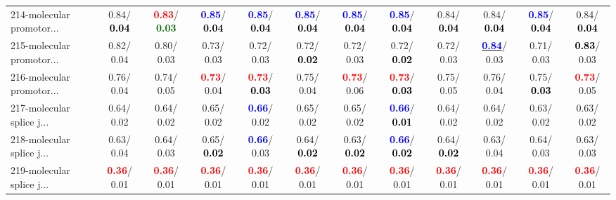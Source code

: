 \begin{table}[h]
\begin{center}
{\begin{tabular}{lc|c|c|c|c|c|c|c|c|c|c}
214-molecular promotor... &   0.84/\textcolor{black}{\textbf{  0.04}} & \textcolor{red}{\textbf{  0.83}}/\textcolor{darkgreen}{\textbf{  0.03}} & \textcolor{blue}{\textbf{  0.85}}/\textcolor{black}{\textbf{  0.04}} & \textcolor{blue}{\textbf{  0.85}}/\textcolor{black}{\textbf{  0.04}} & \textcolor{blue}{\textbf{  0.85}}/\textcolor{black}{\textbf{  0.04}} & \textcolor{blue}{\textbf{  0.85}}/\textcolor{black}{\textbf{  0.04}} & \textcolor{blue}{\textbf{  0.85}}/\textcolor{black}{\textbf{  0.04}} &   0.84/\textcolor{black}{\textbf{  0.04}} &   0.84/\textcolor{black}{\textbf{  0.04}} & \textcolor{blue}{\textbf{  0.85}}/\textcolor{black}{\textbf{  0.04}} &   0.84/\textcolor{black}{\textbf{  0.04}} \\
215-molecular promotor... &   0.82/  0.04 &   0.80/  0.03 &   0.73/  0.03 &   0.72/  0.03 &   0.72/\textcolor{black}{\textbf{  0.02}} &   0.72/  0.03 &   0.72/\textcolor{black}{\textbf{  0.02}} &   0.72/  0.03 & \underline{\textcolor{blue}{\textbf{  0.84}}}/  0.03 &   0.71/  0.03 & \textcolor{black}{\textbf{  0.83}}/  0.03 \\
216-molecular promotor... &   0.76/  0.04 &   0.74/  0.05 & \textcolor{red}{\textbf{  0.73}}/  0.04 & \textcolor{red}{\textbf{  0.73}}/\textcolor{black}{\textbf{  0.03}} &   0.75/  0.04 & \textcolor{red}{\textbf{  0.73}}/  0.06 & \textcolor{red}{\textbf{  0.73}}/\textcolor{black}{\textbf{  0.03}} &   0.75/  0.05 &   0.76/  0.04 &   0.75/\textcolor{black}{\textbf{  0.03}} & \textcolor{red}{\textbf{  0.73}}/  0.05 \\
217-molecular splice j... &   0.64/  0.02 &   0.64/  0.02 &   0.65/  0.02 & \textcolor{blue}{\textbf{  0.66}}/  0.02 &   0.65/  0.02 &   0.65/  0.02 & \textcolor{blue}{\textbf{  0.66}}/\textcolor{black}{\textbf{  0.01}} &   0.64/  0.02 &   0.64/  0.02 &   0.63/  0.02 &   0.63/  0.02 \\
218-molecular splice j... &   0.63/  0.04 &   0.64/  0.03 &   0.65/\textcolor{black}{\textbf{  0.02}} & \textcolor{blue}{\textbf{  0.66}}/  0.03 &   0.64/\textcolor{black}{\textbf{  0.02}} &   0.63/\textcolor{black}{\textbf{  0.02}} & \textcolor{blue}{\textbf{  0.66}}/\textcolor{black}{\textbf{  0.02}} &   0.64/\textcolor{black}{\textbf{  0.02}} &   0.63/  0.04 &   0.64/  0.03 &   0.63/  0.03 \\
219-molecular splice j... & \textcolor{red}{\textbf{  0.36}}/  0.01 & \textcolor{red}{\textbf{  0.36}}/  0.01 & \textcolor{red}{\textbf{  0.36}}/  0.01 & \textcolor{red}{\textbf{  0.36}}/  0.01 & \textcolor{red}{\textbf{  0.36}}/  0.01 & \textcolor{red}{\textbf{  0.36}}/  0.01 & \textcolor{red}{\textbf{  0.36}}/  0.01 & \textcolor{red}{\textbf{  0.36}}/  0.01 & \textcolor{red}{\textbf{  0.36}}/  0.01 & \textcolor{red}{\textbf{  0.36}}/  0.01 & \textcolor{red}{\textbf{  0.36}}/  0.01 \\

\end{tabular}}
\end{center}
\end{table}
